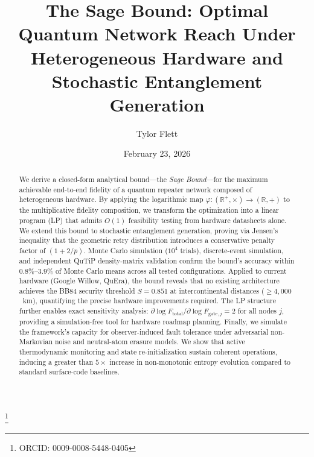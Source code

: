 \documentclass[aps,pra,reprint,amsmath,amssymb,superscriptaddress]{revtex4-2}
\begin{document}
\title{The Sage Bound: Optimal Quantum Network Reach Under\\
Heterogeneous Hardware and Stochastic Entanglement Generation}

\author{Tylor Flett}
\thanks{ORCID: 0009-0008-5448-0405}

\date{February 23, 2026}

\begin{abstract}
We derive a closed-form analytical bound---the \emph{Sage Bound}---for the maximum achievable end-to-end fidelity of a quantum repeater network composed of heterogeneous hardware. By applying the logarithmic map $\varphi: (\mathbb{R}^+, \times) \to (\mathbb{R}, +)$ to the multiplicative fidelity composition, we transform the optimization into a linear program (LP) that admits $O(1)$ feasibility testing from hardware datasheets alone. We extend this bound to stochastic entanglement generation, proving via Jensen's inequality that the geometric retry distribution introduces a conservative penalty factor of $(1 + 2/p)$. Monte Carlo simulation ($10^4$ trials), discrete-event simulation, and independent QuTiP density-matrix validation confirm the bound's accuracy within $0.8\%$--$3.9\%$ of Monte Carlo means across all tested configurations. Applied to current hardware (Google Willow, QuEra), the bound reveals that no existing architecture achieves the BB84 security threshold $S = 0.851$ at intercontinental distances ($\geq 4{,}000$~km), quantifying the precise hardware improvements required. The LP structure further enables exact sensitivity analysis: $\partial \log F_{\text{total}} / \partial \log F_{\text{gate},j} = 2$ for all nodes $j$, providing a simulation-free tool for hardware roadmap planning. Finally, we simulate the framework's capacity for observer-induced fault tolerance under adversarial non-Markovian noise and neutral-atom erasure models. We show that active thermodynamic monitoring and state re-initialization sustain coherent operations, inducing a greater than $5\times$ increase in non-monotonic entropy evolution compared to standard surface-code baselines.
\end{abstract}

\maketitle

\end{document}
